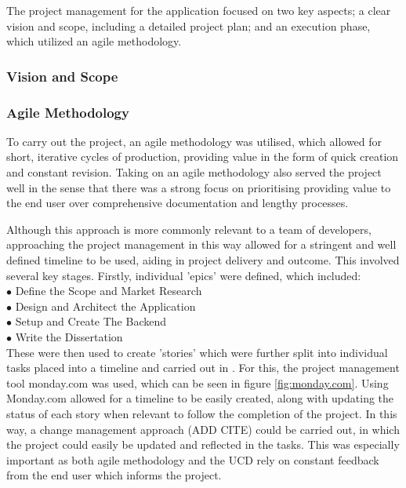 \documentclass[12pt]{article}
\begin{document}
	The project management for the application focused on two key aspects; a clear vision and scope, including a detailed project plan; and an execution phase, which utilized an agile methodology.
	
	\subsubsection{Vision and Scope}
	
	
	\subsubsection{Agile Methodology}
	To carry out the project, an agile methodology was utilised, which allowed for short, iterative cycles of production, providing value in the form of quick creation and constant revision. Taking on an agile methodology also served the project well in the sense that there was a strong focus on prioritising providing value to the end user over comprehensive documentation and lengthy processes. 
	
	Although this approach is more commonly relevant to a team of developers, approaching the project management in this way allowed for a stringent and well defined timeline to be used, aiding in project delivery and outcome. This involved several key stages.
	Firstly, individual 'epics' were defined, which included:
	\\
	$\bullet$ Define the Scope and Market Research
	\\
	$\bullet$ Design and Architect the Application
	\\
	$\bullet$ Setup and Create The Backend
	\\
	$\bullet$ Write the Dissertation
	\\
	
	These were then used to create 'stories' which were further split into individual tasks placed into a timeline and carried out in . For this, the project management tool monday.com \cite{monday.com} was used, which can be seen in figure \ref{fig:monday.com}. Using Monday.com allowed for a timeline to be easily created, along with updating the status of each story when relevant to follow the completion of the project. In this way, a change management approach (ADD CITE) could be carried out, in which the project could easily be updated and reflected in the tasks. This was especially important as both agile methodology and the UCD rely on constant feedback from the end user which informs the project.
	
\end{document}
